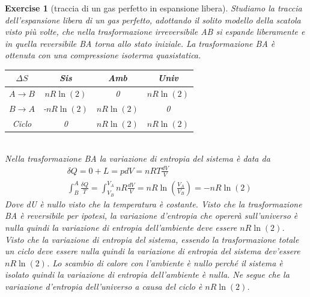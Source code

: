 \documentclass[10pt,a4paper]{article}
\newtheorem{exercise}{Exercise}
\begin{document}
\begin{exercise}[traccia di un gas perfetto in espansione libera]
Studiamo la traccia dell'espansione libera di un gas perfetto, adottando il solito modello della scatola visto più volte, che nella trasformazione irreversibile AB si espande liberamente e in quella reversibile BA torna allo stato iniziale. La trasformazione BA è ottenuta con una compressione isoterma quasistatica. 
\begin{table}[h!]
	\begin{center}
		\begin{tabular}{ || c| c | c| c|| }
			\hline
			\(\Delta S\) & Sis& Amb& Univ\\
			\hline
			\(A\rightarrow B\)& \(nR\ln(2)\)   &0  &\(nR\ln(2)\)  \\
			\(B\rightarrow A\)& -\(nR\ln(2)\)    &\(nR\ln(2)\)   &0\\
			\hline
			Ciclo         & 0    &\(nR\ln(2)\) &\(nR\ln(2)\) \\
			\hline
		\end{tabular}
	\end{center}
\end{table}\\
Nella trasformazione BA la variazione di entropia del sistema è data da 
\begin{align*}
	&\delta Q = 0+L = pdV=nRT\frac{dV}{V}\\
	&\int_{B}^{A}\frac{\delta Q}{T} = \int_{V_B}^{V_A}nR\frac{dV}{V} = nR\ln\left(\frac{V_A}{V_B}\right) =-nR\ln(2)
\end{align*}
Dove dU è nullo visto che la temperatura è costante. Visto che la trasformazione BA è reversibile per ipotesi, la variazione d'entropia che opererà sull'universo è nulla quindi la variazione di entropia dell'ambiente deve essere \(nR\ln(2)\).\\
Visto che la variazione di entropia del sistema, essendo la trasformazione totale un ciclo deve essere nulla quindi la variazione di entropia del sistema dev'essere \(nR\ln(2)\). Lo scambio di calore con l'ambiente è nullo perché il sistema è isolato quindi la variazione di entropia dell'ambiente è nulla. Ne segue che la variazione d'entropia dell'universo a causa del ciclo è \(nR\ln(2)\).
\end{exercise}
\end{document}
